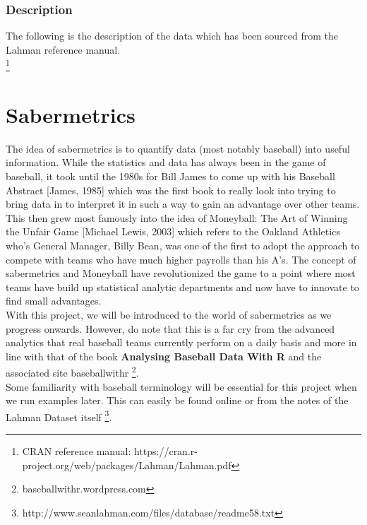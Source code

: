 \documentclass[11pt,a4paper]{report}
\begin{document}
\subsubsection{Description}
The following is the description of the data which has been sourced from the Lahman reference manual.\cite{Lahman}\\
\footnote{CRAN reference manual: https://cran.r-project.org/web/packages/Lahman/Lahman.pdf}

\section{Sabermetrics}
The idea of sabermetrics is to quantify data (most notably baseball) into useful information. While the statistics and data has always been in the game of baseball, it took until the 1980s for Bill James to come up with his Baseball Abstract [James, 1985] which was the first book to really look into trying to bring data in to interpret it in such a way to gain an advantage over other teams. This then grew most famously into the idea of Moneyball: The Art of Winning the Unfair Game [Michael Lewis, 2003] which refers to the Oakland Athletics who's General Manager, Billy Bean, was one of the first to adopt the approach to compete with teams who have much higher payrolls than his A's.
The concept of sabermetrics and Moneyball have revolutionized the game to a point where most teams have build up statistical analytic departments and now have to innovate to find small advantages.\\ 
\bigskip
With this project, we will be introduced to the world of sabermetrics as we progress onwards. However, do note that this is a far cry from the advanced analytics that real baseball teams currently perform on a daily basis and more in line with that of the book \textbf{Analysing Baseball Data With R} \cite{baseballr} and the associated site baseballwithr \footnote{baseballwithr.wordpress.com}.\\
\bigskip
Some familiarity with baseball terminology will be essential for this project when we run examples later. This can easily be found online or from the notes of the Lahman Dataset itself \footnote{http://www.seanlahman.com/files/database/readme58.txt}.
\end{document}
